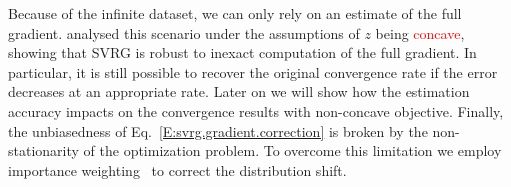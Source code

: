 \documentclass{article}
\makeatletter
\theoremstyle{remark}
\theoremstyle{definition}
\DeclareRobustCommand{\eg}{e.g.,\@\xspace}
\makeatother
\begin{document}
Because of the infinite dataset, we can only rely on an estimate of the full gradient.
\citet{harikandeh2015stopwasting} analysed this scenario under the assumptions of $z$ being \textcolor{red}{concave}, showing that SVRG is robust to inexact computation of the full gradient. In particular, it is still possible to recover the original convergence rate if the error decreases at an appropriate rate. {\color{red}Later on we will show how the estimation accuracy impacts on the convergence results with non-concave objective.} 
Finally, the unbiasedness of Eq.~\ref{E:svrg.gradient.correction} is broken by the non-stationarity of the optimization problem.
To overcome this limitation we employ importance weighting~\citep[\eg][]{rubinstein1981simulation,precup2000eligibility} to correct the distribution shift.
\end{document}
